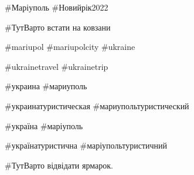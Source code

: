 \#Маріуполь \#Новийрік2022 

\#ТутВарто встати на ковзани 

\#mariupol \#mariupolcity \#ukraine 

\#ukrainetravel \#ukrainetrip 

\#украина  \#мариуполь 

\#украинатуристическая \#мариупольтуристический  

\#україна \#маріуполь 

\#українатуристична \#маріупольтуристичний

\#ТутВарто відвідати ярмарок.
